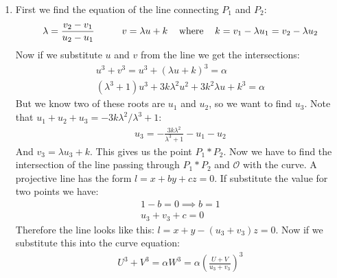 \begin{enumerate}[label=\ilabel]
    \item 
        First we find the equation of the line connecting $P_1$ and $P_2$:
        \begin{gather*}
            \lambda = \frac{v_2 - v_1}{u_2 - u_1} \hspace{1cm}
            v = \lambda u + k \hspace{.3cm} \text{ where } \hspace{.3cm} k = v_1 - \lambda u_1 = v_2 - \lambda u_2 
        \end{gather*}
        Now if we substitute $u$ and $v$ from the line we get the intersections:
        \begin{gather*}
            u^3 + v^3 = u^3 + (\lambda u + k)^3 = \alpha \\
            (\lambda^3 + 1) u^3 + 3k\lambda^2 u^2 + 3k^2 \lambda u + k^3 = \alpha
        \end{gather*}
        But we know two of these roots are $u_1$ and $u_2$, so we want to find $u_3$. Note that $u_1 + u_2 + u_3 = - 3k\lambda^2 / \lambda^3 + 1$:
        \begin{gather*}
            u_3 = -\frac{3k\lambda^2}{\lambda^3 + 1} - u_1 - u_2
        \end{gather*}
        And $v_3 = \lambda u_3 + k$. This gives us the point $P_1 * P_2$. Now we have to find the intersection of the line passing through $P_1 * P_2$ and $\mathcal{O}$ with the curve. A projective line has the form $l = x + by + cz = 0$. If substitute the value for two points we have:
        \begin{gather*}
            1 - b = 0 \implies b = 1 \\
            u_3 + v_3 + c = 0
        \end{gather*}
        Therefore the line looks like this: $l = x + y - (u_3 + v_3) z = 0$. Now if we substitute this into the curve equation:
        \begin{gather*}
            U^3 + V^3 = \alpha W^3 = \alpha (\frac{U + V}{u_3 + v_3})^3
        \end{gather*}
\end{enumerate}